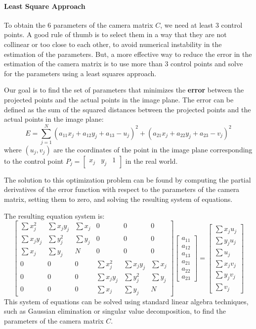 \paragraph{Least Square Approach}
To obtain the 6 parameters of the camera matrix \( C \), we need at least 3 control points. 
A good rule of thumb is to select them in a way that they are not collinear or too close to each other, to avoid numerical instability in the estimation of the parameters.
But, a more effective way to reduce the error in the estimation of the camera matrix is to use more than 3 control points and solve for the parameters using a least squares approach.

Our goal is to find the set of parameters that minimizes the \textbf{error} between the projected points and the actual points in the image plane.
The error can be defined as the sum of the squared distances between the projected points and the actual points in the image plane:
\[ E = \sum_{j=1}^{N} (a_{11} x_j + a_{12} y_j + a_{13} - u_j)^2 + (a_{21} x_j + a_{22} y_j + a_{23} - v_j)^2 \]
where \( (u_j, v_j) \) are the coordinates of the point in the image plane corresponding to the control point \( P_j = \begin{bmatrix} x_j & y_j & 1 \end{bmatrix} \) in the real world.

The solution to this optimization problem can be found by computing the partial derivatives of the error function with respect to the parameters of the camera matrix,
setting them to zero, and solving the resulting system of equations.

The resulting equation system is:
\[ \begin{bmatrix}
    \sum x_j^2 & \sum x_j y_j & \sum x_j & 0 & 0 & 0 \\
    \sum x_j y_j & \sum y_j^2 & \sum y_j & 0 & 0 & 0 \\
    \sum x_j & \sum y_j & N & 0 & 0 & 0 \\
    0 & 0 & 0 & \sum x_j^2 & \sum x_j y_j & \sum x_j \\
    0 & 0 & 0 & \sum x_j y_j & \sum y_j^2 & \sum y_j \\
    0 & 0 & 0 & \sum x_j & \sum y_j & N
\end{bmatrix}
\begin{bmatrix}
    a_{11} \\ a_{12} \\ a_{13} \\ a_{21} \\ a_{22} \\ a_{23}
\end{bmatrix} =
\begin{bmatrix}
    \sum x_j u_j \\ \sum y_j u_j \\ \sum u_j \\ \sum x_j v_j \\ \sum y_j v_j \\ \sum v_j
\end{bmatrix} \]
This system of equations can be solved using standard linear algebra techniques, such as Gaussian elimination or singular value decomposition, to find the parameters of the camera matrix \( C \).

